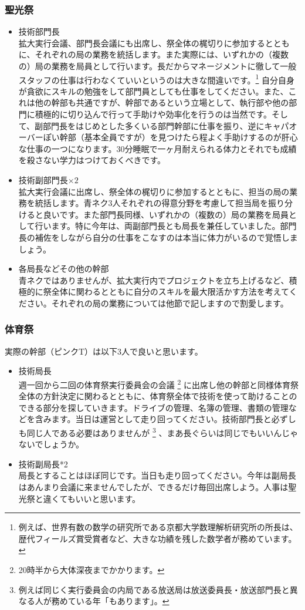 \documentclass[dvipdfmx,jb5]{jarticle}
\begin{document}
\subsubsection{聖光祭}
\begin{itemize}
  \item 技術部門長\\
  拡大実行会議、部門長会議にも出席し、祭全体の梶切りに参加するとともに、それぞれの局の業務を統括します。また実際には、いずれかの（複数の）局の業務を局員として行います。長だからマネージメントに徹して一般スタッフの仕事は行わなくていいというのは大きな間違いです。\footnote{例えば、世界有数の数学の研究所である京都大学数理解析研究所の所長は、歴代フィールズ賞受賞者など、大きな功績を残した数学者が務めています。} 自分自身が貪欲にスキルの勉強をして部門員としても仕事をしてください。また、これは他の幹部も共通ですが、幹部であるという立場として、執行部や他の部門に積極的に切り込んで行って手助けや効率化を行うのは当然です。そして、副部門長をはじめとした多くいる部門幹部に仕事を振り、逆にキャパオーバーぽい幹部（基本全員ですが）を見つけたら程よく手助けするのが肝心な仕事の一つになります。30分睡眠で一ヶ月耐えられる体力とそれでも成績を殺さない学力はつけておくべきです。
　\item 技術副部門長$\times2$\\
  拡大実行会議に出席し、祭全体の梶切りに参加するとともに、担当の局の業務を統括します。青ネク3人それぞれの得意分野を考慮して担当局を振り分けると良いです。また部門長同様、いずれかの（複数の）局の業務を局員として行います。特に今年は、両副部門長とも局長を兼任していました。部門長の補佐をしながら自分の仕事をこなすのは本当に体力がいるので覚悟しましょう。
  \item 各局長などその他の幹部\\
  青ネクではありませんが、拡大実行内でプロジェクトを立ち上げるなど、積極的に祭全体に関わるとともに自分のスキルを最大限活かす方法を考えてください。それぞれの局の業務については他節で記しますので割愛します。
\end{itemize}
\subsubsection{体育祭}
実際の幹部（ピンクT）は以下3人で良いと思います。
\begin{itemize}
  \item 技術局長\\
  週一回から二回の体育祭実行委員会の会議 \footnote{20時半から大体深夜までかかります。} に出席し他の幹部と同様体育祭全体の方針決定に関わるとともに、体育祭全体で技術を使って助けることのできる部分を探していきます。ドライブの管理、名簿の管理、書類の管理などを含みます。当日は運営として走り回ってください。技術部門長と必ずしも同じ人である必要はありませんが \footnote{例えば同じく実行委員会の内局である放送局は放送委員長・放送部門長と異なる人が務めている年「もあります」。} 、まあ長ぐらいは同じでもいいんじゃないでしょうか。
　\item 技術副局長*2\\
  局長とすることはほぼ同じです。当日も走り回ってください。今年は副局長はあんまり会議に来ませんでしたが、できるだけ毎回出席しよう。人事は聖光祭と違くてもいいと思います。
\end{itemize}
\end{document}
